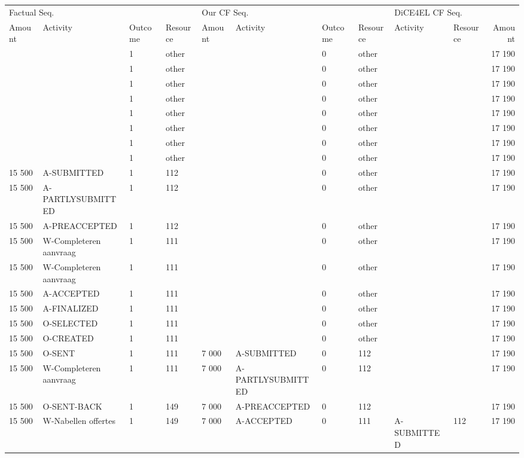 \begin{tabular}{llllllllllr}
\toprule
\multicolumn{4}{l}{Factual Seq.} & \multicolumn{4}{l}{Our CF Seq.} & \multicolumn{3}{l}{DiCE4EL CF Seq.} \\
Amount & Activity & Outcome & Resource & Amount & Activity & Outcome & Resource & Activity & Resource & Amount \\
\midrule
 &  & 1 & other &  &  & 0 & other &  &  & 17 190 \\
 &  & 1 & other &  &  & 0 & other &  &  & 17 190 \\
 &  & 1 & other &  &  & 0 & other &  &  & 17 190 \\
 &  & 1 & other &  &  & 0 & other &  &  & 17 190 \\
 &  & 1 & other &  &  & 0 & other &  &  & 17 190 \\
 &  & 1 & other &  &  & 0 & other &  &  & 17 190 \\
 &  & 1 & other &  &  & 0 & other &  &  & 17 190 \\
 &  & 1 & other &  &  & 0 & other &  &  & 17 190 \\
15 500 & A-SUBMITTED & 1 & 112 &  &  & 0 & other &  &  & 17 190 \\
15 500 & A-PARTLYSUBMITTED & 1 & 112 &  &  & 0 & other &  &  & 17 190 \\
15 500 & A-PREACCEPTED & 1 & 112 &  &  & 0 & other &  &  & 17 190 \\
15 500 & W-Completeren aanvraag & 1 & 111 &  &  & 0 & other &  &  & 17 190 \\
15 500 & W-Completeren aanvraag & 1 & 111 &  &  & 0 & other &  &  & 17 190 \\
15 500 & A-ACCEPTED & 1 & 111 &  &  & 0 & other &  &  & 17 190 \\
15 500 & A-FINALIZED & 1 & 111 &  &  & 0 & other &  &  & 17 190 \\
15 500 & O-SELECTED & 1 & 111 &  &  & 0 & other &  &  & 17 190 \\
15 500 & O-CREATED & 1 & 111 &  &  & 0 & other &  &  & 17 190 \\
15 500 & O-SENT & 1 & 111 & 7 000 & A-SUBMITTED & 0 & 112 &  &  & 17 190 \\
15 500 & W-Completeren aanvraag & 1 & 111 & 7 000 & A-PARTLYSUBMITTED & 0 & 112 &  &  & 17 190 \\
15 500 & O-SENT-BACK & 1 & 149 & 7 000 & A-PREACCEPTED & 0 & 112 &  &  & 17 190 \\
15 500 & W-Nabellen offertes & 1 & 149 & 7 000 & A-ACCEPTED & 0 & 111 & A-SUBMITTED & 112 & 17 190 \\

\end{tabular}
